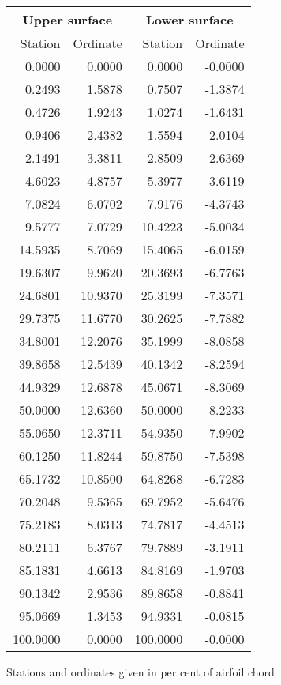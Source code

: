 \documentclass[11pt]{book}
\begin{document}
 \hspace{4mm}
 \begin{tabular}{|r|r|r|r|} \hline 
 \multicolumn{2}{|c|}{Upper surface} & \multicolumn{2}{|c|}{Lower surface} \\
 \hline
 Station & Ordinate & Station & Ordinate \\
 \hline
0.0000 & 0.0000 & 0.0000 & -0.0000 \\
0.2493 & 1.5878 & 0.7507 & -1.3874 \\
0.4726 & 1.9243 & 1.0274 & -1.6431 \\
0.9406 & 2.4382 & 1.5594 & -2.0104 \\
2.1491 & 3.3811 & 2.8509 & -2.6369 \\
4.6023 & 4.8757 & 5.3977 & -3.6119 \\
7.0824 & 6.0702 & 7.9176 & -4.3743 \\
9.5777 & 7.0729 & 10.4223 & -5.0034 \\
14.5935 & 8.7069 & 15.4065 & -6.0159 \\
19.6307 & 9.9620 & 20.3693 & -6.7763 \\
24.6801 & 10.9370 & 25.3199 & -7.3571 \\
29.7375 & 11.6770 & 30.2625 & -7.7882 \\
34.8001 & 12.2076 & 35.1999 & -8.0858 \\
39.8658 & 12.5439 & 40.1342 & -8.2594 \\
44.9329 & 12.6878 & 45.0671 & -8.3069 \\
50.0000 & 12.6360 & 50.0000 & -8.2233 \\
55.0650 & 12.3711 & 54.9350 & -7.9902 \\
60.1250 & 11.8244 & 59.8750 & -7.5398 \\
65.1732 & 10.8500 & 64.8268 & -6.7283 \\
70.2048 & 9.5365 & 69.7952 & -5.6476 \\
75.2183 & 8.0313 & 74.7817 & -4.4513 \\
80.2111 & 6.3767 & 79.7889 & -3.1911 \\
85.1831 & 4.6613 & 84.8169 & -1.9703 \\
90.1342 & 2.9536 & 89.8658 & -0.8841 \\
95.0669 & 1.3453 & 94.9331 & -0.0815 \\
100.0000 & 0.0000 & 100.0000 & -0.0000 \\
 \hline 
 \end{tabular}
 \vspace{8mm}

Stations and ordinates given in per cent of airfoil chord
\end{document}
